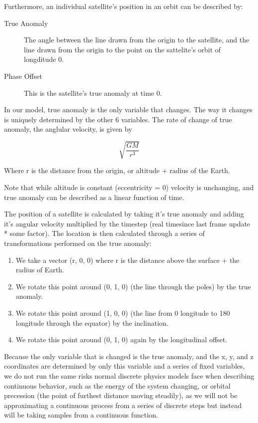 \documentclass[12pt]{article}
\begin{document}
Furthermore, an individual satellite's position in an orbit can be described by:

\begin{description}
\item[True Anomaly]
The angle between the line drawn from the origin to the satellite, and the line drawn from the origin to the point on the sattelite's orbit of longditude 0.
\item[Phase Offset]
This is the satellite's true anomaly at time 0.
\end{description}

In our model, true anomaly is the only variable that changes. The way it changes is uniquely determined by the other 6 variables. The rate of change of true anomaly, the anglular velocity, is given by

\[\sqrt{\frac{GM}{r^3}}\]

Where r is the distance from the origin, or altitude + radius of the Earth.

Note that while altitude is constant (eccentricity = 0) velocity is unchanging, and true anomaly can be described as a linear function of time.

The position of a satellite is calculated by taking it’s true anomaly and adding it’s angular velocity multiplied by the timestep (real timesince last frame update * some factor). The location is then calculated through a series of transformations performed on the true anomaly:

\begin{enumerate}
\item We take a vector (r, 0, 0) where r is the distance above the surface + the radius of Earth.
\item We rotate this point around (0, 1, 0) (the line through the poles) by the true anomaly.
\item We rotate this point around (1, 0, 0) (the line from 0 longitude to 180 longitude through the equator) by the inclination.
\item We rotate this point around (0, 1, 0) again by the longitudinal offset.
\end{enumerate}

Because the only variable that is changed is the true anomaly, and the x, y, and z coordinates are determined by only this variable and a series of fixed variables, we do not run the same risks normal discrete physics models face when describing continuous behavior, such as the energy of the system changing, or orbital precession (the point of furthest distance moving steadily), as we will not be approximating a continuous process from a series of discrete steps but instead will be taking samples from a continuous function.
\end{document}
